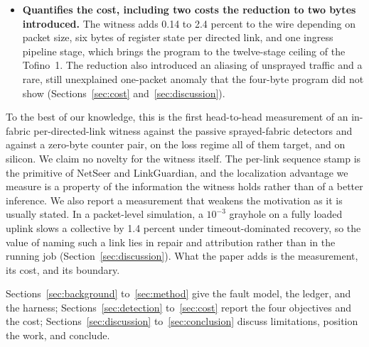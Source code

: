 \begin{itemize}
\item \textbf{Quantifies the cost, including two costs the reduction to two bytes introduced.} The witness adds 0.14 to 2.4 percent to the wire depending on packet size, six bytes of register state per directed link, and one ingress pipeline stage, which brings the program to the twelve-stage ceiling of the Tofino~1. The reduction also introduced an aliasing of unsprayed traffic and a rare, still unexplained one-packet anomaly that the four-byte program did not show (Sections~\ref{sec:cost} and~\ref{sec:discussion}).
\end{itemize}

To the best of our knowledge, this is the first head-to-head measurement of an in-fabric per-directed-link witness against the passive sprayed-fabric detectors and against a zero-byte counter pair, on the loss regime all of them target, and on silicon. We claim no novelty for the witness itself. The per-link sequence stamp is the primitive of NetSeer and LinkGuardian, and the localization advantage we measure is a property of the information the witness holds rather than of a better inference. We also report a measurement that weakens the motivation as it is usually stated. In a packet-level simulation, a $10^{-3}$ grayhole on a fully loaded uplink slows a collective by 1.4 percent under timeout-dominated recovery, so the value of naming such a link lies in repair and attribution rather than in the running job (Section~\ref{sec:discussion}). What the paper adds is the measurement, its cost, and its boundary.

Sections~\ref{sec:background} to~\ref{sec:method} give the fault model, the ledger, and the harness; Sections~\ref{sec:detection} to~\ref{sec:cost} report the four objectives and the cost; Sections~\ref{sec:discussion} to~\ref{sec:conclusion} discuss limitations, position the work, and conclude.

